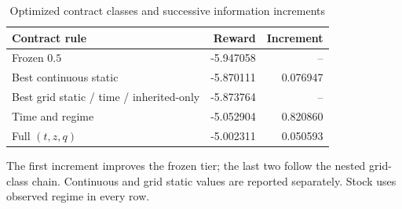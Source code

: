 \begin{table}[htbp]
\centering
\caption{Optimized contract classes and successive information increments}\label{tab:r6adapt}
\small
\begin{tabular}{lrr}
\toprule
Contract rule & Reward & Increment \\
\midrule
Frozen $0.5$ & -5.947058 & -- \\
Best continuous static & -5.870111 & 0.076947 \\
Best grid static / time / inherited-only & -5.873764 & -- \\
Time and regime & -5.052904 & 0.820860 \\
Full $(t,z,q)$ & -5.002311 & 0.050593 \\
\bottomrule
\end{tabular}
\par\smallskip\begin{minipage}{0.96\textwidth}\footnotesize The first increment improves the frozen tier; the last two follow the nested grid-class chain. Continuous and grid static values are reported separately. Stock uses observed regime in every row.\end{minipage}
\end{table}
